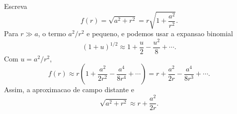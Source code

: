 Escreva
\[
f(r)=\sqrt{a^2+r^2}=r\sqrt{1+\frac{a^2}{r^2}}.
\]
Para $r\gg a$, o termo $a^2/r^2$ e pequeno, e podemos usar a expansao binomial
\[
(1+u)^{1/2} \approx 1 + \frac{u}{2} - \frac{u^2}{8} + \cdots.
\]
Com $u=a^2/r^2$,
\[
f(r) \approx r\left(1+\frac{a^2}{2r^2}-\frac{a^4}{8r^4}+\cdots\right)
= r + \frac{a^2}{2r} - \frac{a^4}{8r^3} + \cdots.
\]
Assim, a aproximacao de campo distante e
\[
\sqrt{a^2+r^2} \approx r + \frac{a^2}{2r}.
\]


